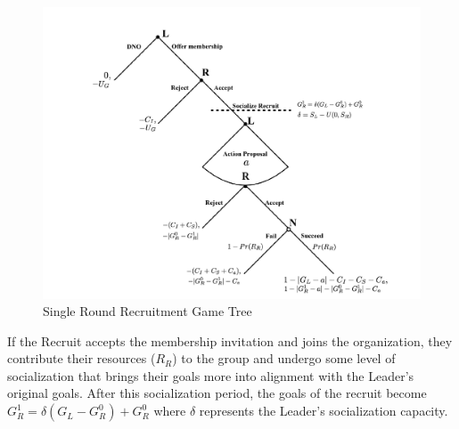 \begin{center}
  \begin{figure}
    \includegraphics[width=\columnwidth]{./Pictures/RecruitGame_Round1.pdf}
    \caption{Single Round Recruitment Game Tree}
        \label{fig:rg}
     \end{figure}
\end{center}

If the Recruit accepts the membership invitation and joins the organization, they contribute their resources ($R_{R}$) to the group and undergo some level of socialization that brings their goals more into alignment with the Leader's original goals. After this socialization period, the goals of the recruit become $G^{1}_{R}=\delta(G_{L}-G^{0}_{R}) + G^{0}_{R}$ where $\delta$ represents the Leader's socialization capacity.

